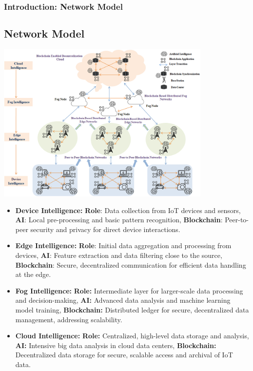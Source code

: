 \documentclass [xcolor=svgnames] {beamer}
\begin{document}
\begin{frame}[allowframebreaks]
\small
\frametitle{Introduction: Network Model}
\subsection{Network Model}

\begin{center}
    \includegraphics[width=0.80\textwidth]{blockIOTIntelligence.jpg} %
\end{center}

\begin{itemize}
\item \textbf{Device Intelligence:} \textbf{Role}: Data collection from IoT devices and sensors, \textbf{AI}: Local pre-processing and basic pattern recognition, \textbf{Blockchain}: Peer-to-peer security and privacy for direct device interactions.

\item \textbf{Edge Intelligence:} \textbf{Role}: Initial data aggregation and processing from devices, \textbf{AI}: Feature extraction and data filtering close to the source, \textbf{Blockchain}: Secure, decentralized communication for efficient data handling at the edge.

\item \textbf{Fog Intelligence:} \textbf{Role:} Intermediate layer for larger-scale data processing and decision-making, \textbf{AI:} Advanced data analysis and machine learning model training, \textbf{Blockchain:} Distributed ledger for secure, decentralized data management, addressing scalability.
    
\item \textbf{Cloud Intelligence:} \textbf{Role:} Centralized, high-level data storage and analysis, \textbf{AI:} Intensive big data analysis in cloud data centers, \textbf{Blockchain:} Decentralized data storage for secure, scalable access and archival of IoT data.
\end{itemize}

\end{frame}
\end{document}
